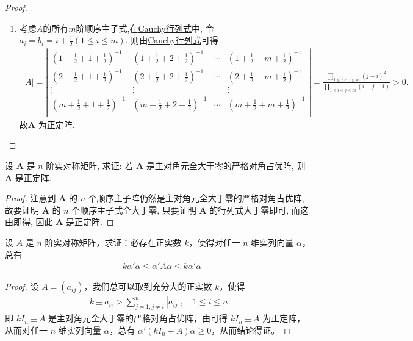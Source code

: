\documentclass[../../main.tex]{subfiles}%
\begin{document}
\begin{proof}
\begin{enumerate}[(1)]
\item 考虑$A$的所有$m$阶顺序主子式,在\hyperref[Cauchy行列式]{Cauchy行列式}中, 令 \(a_i = b_i = i+\frac{1}{2}(1\leqslant  i\leqslant  m)\), 则由\hyperref[Cauchy行列式]{Cauchy行列式}可得
\begin{align*}
|A|=\left| \begin{matrix}
(1+\frac{1}{2}+1+\frac{1}{2})^{-1}&		(1+\frac{1}{2}+2+\frac{1}{2})^{-1}&		\cdots&		(1+\frac{1}{2}+m+\frac{1}{2})^{-1}\\
(2+\frac{1}{2}+1+\frac{1}{2})^{-1}&		(2+\frac{1}{2}+2+\frac{1}{2})^{-1}&		\cdots&		(2+\frac{1}{2}+m+\frac{1}{2})^{-1}\\
\vdots&		\vdots&		&		\vdots\\
(m+\frac{1}{2}+1+\frac{1}{2})^{-1}&		(m+\frac{1}{2}+2+\frac{1}{2})^{-1}&		\cdots&		(m+\frac{1}{2}+m+\frac{1}{2})^{-1}\\
\end{matrix} \right|=\frac{\prod\limits_{1\leqslant i<j\leqslant m}{\left( j-i \right) ^2}}{\prod\limits_{1\leqslant i<j\leqslant m}{\left( i+j+1 \right)}}>0.
\end{align*}
故\(\boldsymbol{A}\) 为正定阵.
\end{enumerate} 
\end{proof}

\begin{proposition}\label{proposition:主对角元全大于零的严格对角占优阵必正定}
设 \(\boldsymbol{A}\) 是 \(n\) 阶实对称矩阵, 求证: 若 \(\boldsymbol{A}\) 是主对角元全大于零的严格对角占优阵, 则 \(\boldsymbol{A}\) 是正定阵.
\end{proposition}
\begin{proof}
注意到 \(\boldsymbol{A}\) 的 \(n\) 个顺序主子阵仍然是主对角元全大于零的严格对角占优阵, 故要证明 \(\boldsymbol{A}\) 的 \(n\) 个顺序主子式全大于零, 只要证明 \(\boldsymbol{A}\) 的行列式大于零即可, 而这由即得, 因此 \(\boldsymbol{A}\) 是正定阵. 
\end{proof}

\begin{proposition}\label{proposition:例8.50}
设 \(A\) 是 \(n\) 阶实对称矩阵，求证：必存在正实数 \(k\)，使得对任一 \(n\) 维实列向量 \(\alpha\)，总有
\begin{align*}
-k\alpha'\alpha \leqslant  \alpha'A\alpha \leqslant  k\alpha'\alpha
\end{align*}
\end{proposition}
\begin{proof}
设 \(A = (a_{ij})\)，我们总可以取到充分大的正实数 \(k\)，使得
\begin{align*}
k \pm a_{ii} > \sum_{j = 1,j\neq i}^{n}|a_{ij}|,\quad 1\leqslant  i \leqslant  n
\end{align*}
即 \(kI_n \pm A\) 是主对角元全大于零的严格对角占优阵，由可得 \(kI_n \pm A\) 为正定阵，从而对任一 \(n\) 维实列向量 \(\alpha\)，总有 \(\alpha'(kI_n \pm A)\alpha \geqslant  0\)，从而结论得证。 
\end{proof}
\end{document}
